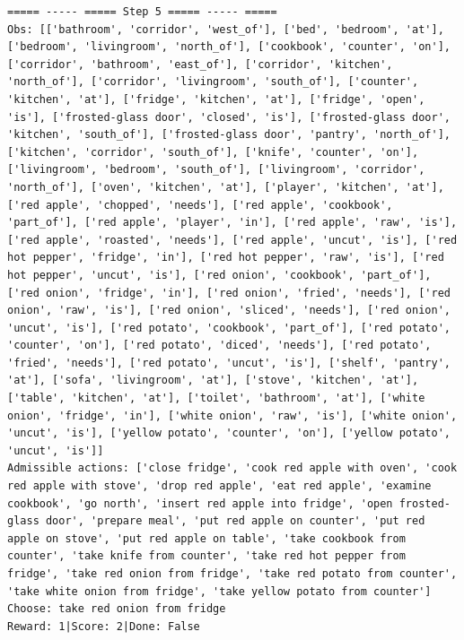 \documentclass[11pt]{article}
\begin{document}
\begin{lstlisting}
===== ----- ===== Step 5 ===== ----- =====
Obs: [['bathroom', 'corridor', 'west_of'], ['bed', 'bedroom', 'at'], ['bedroom', 'livingroom', 'north_of'], ['cookbook', 'counter', 'on'], ['corridor', 'bathroom', 'east_of'], ['corridor', 'kitchen', 'north_of'], ['corridor', 'livingroom', 'south_of'], ['counter', 'kitchen', 'at'], ['fridge', 'kitchen', 'at'], ['fridge', 'open', 'is'], ['frosted-glass door', 'closed', 'is'], ['frosted-glass door', 'kitchen', 'south_of'], ['frosted-glass door', 'pantry', 'north_of'], ['kitchen', 'corridor', 'south_of'], ['knife', 'counter', 'on'], ['livingroom', 'bedroom', 'south_of'], ['livingroom', 'corridor', 'north_of'], ['oven', 'kitchen', 'at'], ['player', 'kitchen', 'at'], ['red apple', 'chopped', 'needs'], ['red apple', 'cookbook', 'part_of'], ['red apple', 'player', 'in'], ['red apple', 'raw', 'is'], ['red apple', 'roasted', 'needs'], ['red apple', 'uncut', 'is'], ['red hot pepper', 'fridge', 'in'], ['red hot pepper', 'raw', 'is'], ['red hot pepper', 'uncut', 'is'], ['red onion', 'cookbook', 'part_of'], ['red onion', 'fridge', 'in'], ['red onion', 'fried', 'needs'], ['red onion', 'raw', 'is'], ['red onion', 'sliced', 'needs'], ['red onion', 'uncut', 'is'], ['red potato', 'cookbook', 'part_of'], ['red potato', 'counter', 'on'], ['red potato', 'diced', 'needs'], ['red potato', 'fried', 'needs'], ['red potato', 'uncut', 'is'], ['shelf', 'pantry', 'at'], ['sofa', 'livingroom', 'at'], ['stove', 'kitchen', 'at'], ['table', 'kitchen', 'at'], ['toilet', 'bathroom', 'at'], ['white onion', 'fridge', 'in'], ['white onion', 'raw', 'is'], ['white onion', 'uncut', 'is'], ['yellow potato', 'counter', 'on'], ['yellow potato', 'uncut', 'is']]
Admissible actions: ['close fridge', 'cook red apple with oven', 'cook red apple with stove', 'drop red apple', 'eat red apple', 'examine cookbook', 'go north', 'insert red apple into fridge', 'open frosted-glass door', 'prepare meal', 'put red apple on counter', 'put red apple on stove', 'put red apple on table', 'take cookbook from counter', 'take knife from counter', 'take red hot pepper from fridge', 'take red onion from fridge', 'take red potato from counter', 'take white onion from fridge', 'take yellow potato from counter']
Choose: take red onion from fridge
Reward: 1|Score: 2|Done: False


\end{lstlisting}
\end{document}
